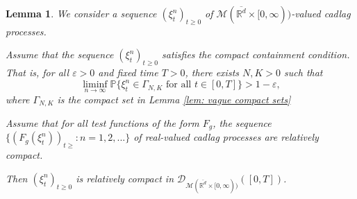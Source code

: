 \documentclass[12pt]{article}
\newtheorem{lemma}[theorem]{Lemma}
\begin{document}
\begin{lemma}
We consider a sequence $(\xi^n_t)_{t\geq 0}$ of $\mathcal{M}(\overline{\mathbb{R}^d} \times [0,\infty))$-valued cadlag processes.

Assume that the sequence $(\xi^n_t)_{t\geq 0}$ satisfies the compact containment condition. That is,
for all $\varepsilon > 0$ and fixed time $T > 0$, there exists $N, K> 0$ such that 
\begin{equation}
\liminf_{n \to \infty} \mathbb{P}\{ \xi^n_t \in \Gamma_{N,K} \text{ for all } t\in [0,T]\} > 1-\varepsilon,
\end{equation}
where $\Gamma_{N,K}$ is the compact set in Lemma \ref{lem: vague compact sets}

Assume that for all test functions of the form $F_g$,
the sequence $\{(F_g(\xi^n_t))_{t \geq}: n=1,2,...\}$ of real-valued cadlag processes are relatively compact. 

Then  $(\xi^n_t )_{t\geq 0}$ is relatively compact in $\mathcal{D}_{\mathcal{M}(\overline{\mathbb{R}^d} \times[0,\infty))}([0,T])$.
\end{lemma}
\end{document}
